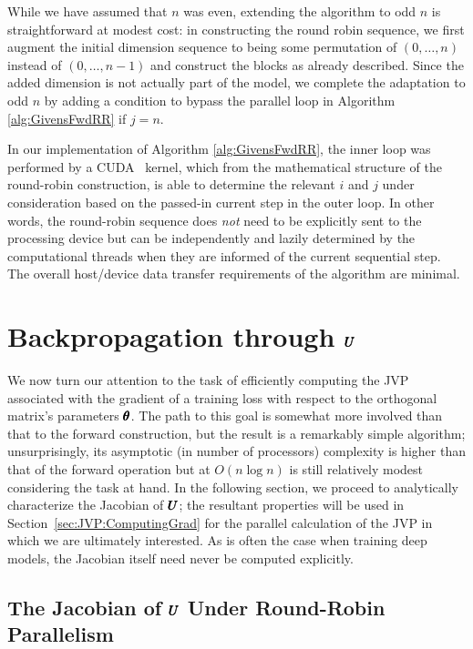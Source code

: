 \documentclass[superscriptaddress,floatfix]{article}
\begin{document}
While we have assumed that $n$ was even, extending the algorithm to
odd $n$ is straightforward at modest cost: in constructing the round
robin sequence, we first augment the initial dimension sequence to
being some permutation of $(0, \ldots, n)$ instead of $(0,\ldots,n-1)$
and construct the blocks as already described. Since the added
dimension is not actually part of the model, we complete the
adaptation to odd $n$ by adding a condition to bypass the parallel
loop in Algorithm \ref{alg:GivensFwdRR} if $j = n$.

In our implementation of Algorithm \ref{alg:GivensFwdRR}, the inner
loop was performed by a CUDA~\cite{cuda} kernel, which from the
mathematical structure of the round-robin construction, is able to
determine the relevant $i$ and $j$ under consideration based on the
passed-in current step in the outer loop. In other words, the
round-robin sequence does \emph{not} need to be explicitly sent to the
processing device but can be independently and lazily determined by
the computational threads when they are informed of the current
sequential step. The overall host/device data transfer requirements of
the algorithm are minimal.

\section{Backpropagation through ${\pmb{U}}$}
\label{sec:JVP}

We now turn our attention to the task of efficiently computing the JVP
associated with the gradient of a training loss with respect to the
orthogonal matrix's parameters ${\pmb{\theta}}$. The path to this goal is
somewhat more involved than that to the forward construction, but the
result is a remarkably simple algorithm; unsurprisingly, its
asymptotic (in number of processors) complexity is higher than that of
the forward operation but at $O(n\log n)$ is still relatively modest
considering the task at hand. In the following section, we proceed to
analytically characterize the Jacobian of ${\pmb{U}}$; the resultant
properties will be used in Section~\ref{sec:JVP:ComputingGrad} for the
parallel calculation of the JVP in which we are ultimately interested.
As is often the case when training deep models, the Jacobian itself
need never be computed explicitly.

\subsection{The Jacobian of ${\pmb{U}}$ Under Round-Robin Parallelism}
\label{sec:JVP:Jacobian}
\end{document}
